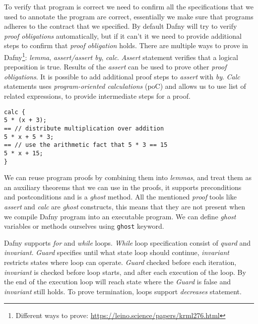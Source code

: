 To verify that program is correct we need to confirm all the specifications that we used to annotate the program are correct, essentially we make sure that programs adheres to the contract that we specified. By default Dafny will try to verify \textit{proof obligations} automatically, but if it can't it we need to provide additional steps to confirm that \textit{proof obligation} holds. There are multiple ways to prove in Dafny\footnote{Different ways to prove: \url{https://leino.science/papers/krml276.html}}: \textit{lemma}, \textit{assert/assert by}, \textit{calc}. \textit{Assert} statement verifies that a logical preposition is true. Results of the \textit{assert} can be used to prove other \textit{proof obligations}. It is possible to add additional proof steps to \textit{assert} with \textit{by}. \textit{Calc} statements uses \textit{program-oriented calculations} (poC) \cite{Leino2014} and allows us to use list of related expressions, to provide intermediate steps for a proof.

\begin{lstlisting}[language=DafnyJS,caption={Calc statement, taken from\cite{Leino2023} },label={lst:calc}]
calc {
5 * (x + 3);
== // distribute multiplication over addition
5 * x + 5 * 3;
== // use the arithmetic fact that 5 * 3 == 15
5 * x + 15;
}
\end{lstlisting}

We can reuse program proofs by combining them into \textit{lemmas}, and treat them as an auxiliary theorems that we can use in the proofs, it supports preconditions and postconditions and is a \textit{ghost} method. All the mentioned \textit{proof} tools like \textit{assert} and \textit{calc} are \textit{ghost} constructs, this means that they are not present when we compile Dafny program into an executable program. We can define \textit{ghost} variables or methods ourselves using \texttt{ghost} keyword.

Dafny supports \textit{for} and \textit{while} loops. \textit{While} loop specification consist of \textit{quard} and \textit{invariant}. \textit{Guard} specifies until what state loop should continue, \textit{invariant} restricts states where loop can operate. \textit{Guard} checked before each iteration, \textit{invariant} is checked before loop starts, and after each execution of the loop. By the end of the execution loop will reach state where the \textit{Guard} is false and \textit{invariant} still holds. To prove termination, loops support \textit{decreases} statement.

